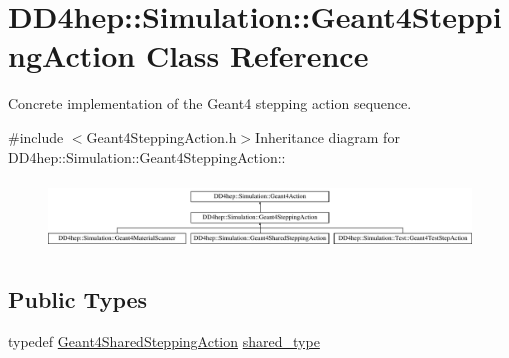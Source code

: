 \hypertarget{class_d_d4hep_1_1_simulation_1_1_geant4_stepping_action}{
\section{DD4hep::Simulation::Geant4SteppingAction Class Reference}
\label{class_d_d4hep_1_1_simulation_1_1_geant4_stepping_action}
}


Concrete implementation of the Geant4 stepping action sequence.  


{\ttfamily \#include $<$Geant4SteppingAction.h$>$}Inheritance diagram for DD4hep::Simulation::Geant4SteppingAction::\begin{figure}[H]
\begin{center}
\leavevmode
\includegraphics[height=1.86047cm]{class_d_d4hep_1_1_simulation_1_1_geant4_stepping_action}
\end{center}
\end{figure}
\subsection*{Public Types}
\begin{DoxyCompactItemize}
\item 
typedef \hyperlink{class_d_d4hep_1_1_simulation_1_1_geant4_shared_stepping_action}{Geant4SharedSteppingAction} \hyperlink{class_d_d4hep_1_1_simulation_1_1_geant4_stepping_action_aa247da84b511779fc413ecb3fbe57125}{shared\_\-type}
\end{DoxyCompactItemize}
